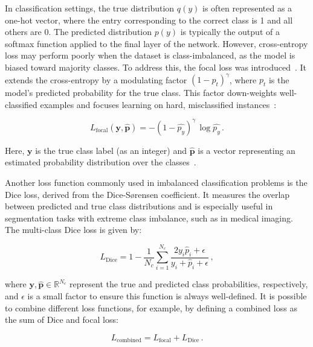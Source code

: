 In classification settings, the true distribution $q(y)$ is often represented as a one-hot vector, where the entry corresponding to the correct class is 1 and all others are 0. The predicted distribution $p(y)$ is typically the output of a softmax function applied to the final layer of the network. 
However, cross-entropy loss may perform poorly when the dataset is class-imbalanced, as the model is biased toward majority classes. To address this, the focal loss was introduced~\cite{lin_focal_2018}. It extends the cross-entropy by a modulating factor $(1 - p_t)^{\gamma}$, where $p_t$ is the model's predicted probability for the true class. This factor down-weights well-classified examples and focuses learning on hard, misclassified instances~\cite{lin_focal_2018}:

\begin{equation}
\label{eq:focal_loss}
	L_{\mathrm{focal}} \left( \mathbf{y}, \hat{\mathbf{p}} \right)  = - \left( 1 - \hat{p_y} \right)^{\gamma} \, \log \hat{p_y} \,.
\end{equation}

Here, $\mathbf{y}$ is the true class label (as an integer) and $\hat{\mathbf{p}}$ is a vector representing an estimated probability distribution over the classes~\cite{mavrin_artemmavrinfocal-loss_2024}. 

Another loss function commonly used in imbalanced classification problems is the Dice loss, derived from the Dice-Sørensen coefficient. It measures the overlap between predicted and true class distributions and is especially useful in segmentation tasks with extreme class imbalance, such as in medical imaging. The multi-class Dice loss is given by:

\begin{equation}
\label{eq:dice_score}
	L_{\mathrm{Dice}} = 1 - \frac{1}{N_c} \sum_{i=1}^{N_c} \frac{2 y_i \hat{p}_i + \epsilon}{y_i + \hat{p}_i + \epsilon} \,,
\end{equation}

\noindent where $\mathbf{y}, \hat{\mathbf{p}} \in \mathbb{R}^{N_c}$ represent the true and predicted class probabilities, respectively, and $\epsilon$ is a small factor to ensure this function is always well-defined. It is possible to combine different loss functions, for example, by defining a combined loss as the sum of Dice and focal loss:

\begin{equation}
\label{eq:combined_loss}
	L_{\mathrm{combined}} = L_{\mathrm{focal}} + L_{\mathrm{Dice}} \,.
\end{equation}

